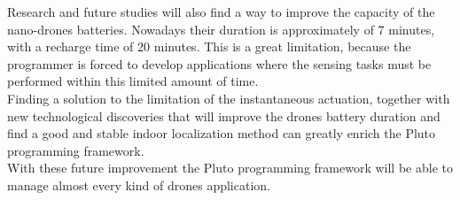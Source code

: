 Research and future studies will also find a way to improve the capacity of the nano-drones batteries. 
Nowadays their duration is approximately of 7 minutes, with a recharge time of 20 minutes.
This is a great limitation, because the programmer is forced to develop applications where the sensing tasks must be performed within this limited amount of time.
\\

Finding a solution to the limitation of the instantaneous actuation, together with new technological discoveries that will improve the drones battery duration and find a good and stable indoor localization method can greatly enrich the Pluto programming framework.
\\

With these future improvement the Pluto programming framework will be able to manage almost every kind of drones application.







